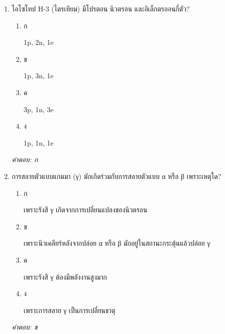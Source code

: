 \documentclass[12pt]{article}
\begin{document}
\begin{enumerate}[label=\arabic*., itemsep=0.5\baselineskip, topsep=0.5\baselineskip, leftmargin=*]
\item ไอโซโทป H-3 (ไตรเทียม) มีโปรตอน นิวตรอน และอิเล็กตรออนกี่ตัว?
\begin{enumerate}[label=\alph*)., itemsep=0.3\baselineskip, topsep=0.3\baselineskip]
\item ก\ 
\begin{minipage}[t]{0.9\linewidth}
\raggedright 1p, 2n, 1e
\end{minipage}
\item ข\ 
\begin{minipage}[t]{0.9\linewidth}
\raggedright 1p, 3n, 1e
\end{minipage}
\item ค\ 
\begin{minipage}[t]{0.9\linewidth}
\raggedright 3p, 1n, 3e
\end{minipage}
\item ง\ 
\begin{minipage}[t]{0.9\linewidth}
\raggedright 1p, 1n, 1e
\end{minipage}
\end{enumerate}
\vspace{-0.3\baselineskip}
\begin{small}
\textit{คำตอบ: ก}
\end{small}

\item การสลายตัวแบบแกมมา (γ) มักเกิดร่วมกับการสลายตัวแบบ α หรือ β เพราะเหตุใด?
\begin{enumerate}[label=\alph*)., itemsep=0.3\baselineskip, topsep=0.3\baselineskip]
\item ก\ 
\begin{minipage}[t]{0.9\linewidth}
\raggedright เพราะรังสี γ เกิดจากการเปลี่ยนแปลงของนิวตรอน
\end{minipage}
\item ข\ 
\begin{minipage}[t]{0.9\linewidth}
\raggedright เพราะนิวเคลียร์หลังจากปล่อย α หรือ β มักอยู่ในสถานะกระตุ้นแล้วปล่อย γ
\end{minipage}
\item ค\ 
\begin{minipage}[t]{0.9\linewidth}
\raggedright เพราะรังสี γ ต้องมีพลังงานสูงมาก
\end{minipage}
\item ง\ 
\begin{minipage}[t]{0.9\linewidth}
\raggedright เพราะการสลาย γ เป็นการเปลี่ยนธาตุ
\end{minipage}
\end{enumerate}
\vspace{-0.3\baselineskip}
\begin{small}
\textit{คำตอบ: ข}
\end{small}


\end{enumerate}
\end{document}

